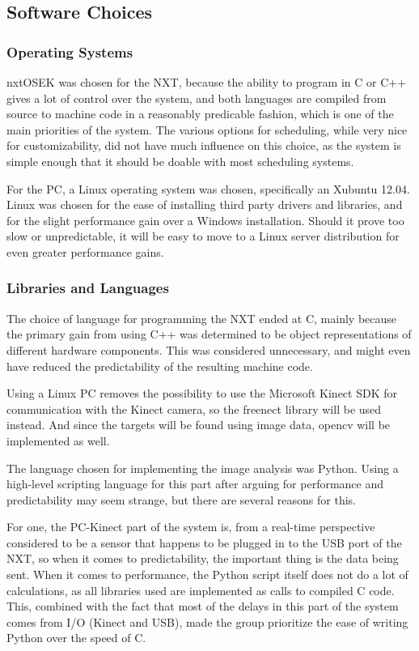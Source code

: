 \subsection{Software Choices}

\subsubsection*{Operating Systems}
nxtOSEK was chosen for the NXT, because the ability to program in C or C++ gives a lot of control over the
system, and both languages are compiled from source to machine code in a reasonably predicable fashion, which
is one of the main priorities of the system. The various options for scheduling,
while very nice for customizability, did not have much influence on this choice, as the system is simple enough
that it should be doable with most scheduling systems.

For the PC, a Linux operating system was chosen, specifically an Xubuntu 12.04. Linux was chosen for the ease
of installing third party drivers and libraries, and for the slight performance gain over a Windows installation.
Should it prove too slow or unpredictable, it will be easy to move to a Linux server distribution for even
greater performance gains. 

\subsubsection*{Libraries and Languages}
The choice of language for programming the NXT ended at C, mainly because the primary gain from using C++ was
determined to be object representations of different hardware components. This was considered unnecessary,
and might even have reduced the predictability of the resulting machine code.

Using a Linux PC removes the possibility to use the Microsoft Kinect SDK for communication with the
Kinect camera, so the freenect library will be used instead. And since the targets will be found using image
data, \ac{opencv} will be implemented as well.

The language chosen for implementing the image analysis was Python. Using a high-level scripting language for
this part after arguing for performance and predictability may seem strange, but there are several reasons for
this.

For one, the PC-Kinect part of the system is, from a real-time perspective considered to be a sensor that
happens to be plugged in to the USB port of the NXT, so when it comes to predictability, the important thing is
the data being sent.
When it comes to performance, the Python script itself does not do a lot of calculations, as all libraries used
are implemented as calls to compiled C code. This, combined with the fact that most of the delays in this part
of the system comes from I/O (Kinect and USB), made the group prioritize the ease of writing Python over the
speed of C.
